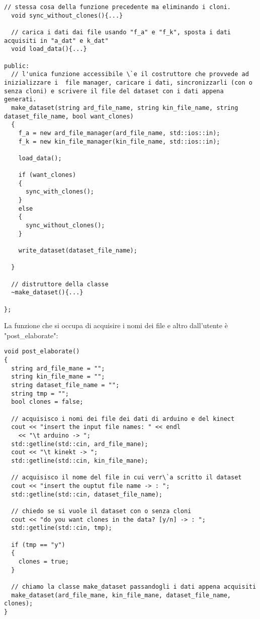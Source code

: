 \documentclass[10pt,a4paper]{article}
\begin{document}
\begin{lstlisting}[style=mycpp, caption=librerie usate, captionpos=b]
  // stessa cosa della funzione precedente ma eliminando i cloni.
  void sync_without_clones(){...}

  // carica i dati dai file usando "f_a" e "f_k", sposta i dati acquisiti in "a_dat" e k_dat"
  void load_data(){...}

public:
  // l'unica funzione accessibile \`e il costruttore che provvede ad inizializzare i  file manager, caricare i dati, sincronizzarli (con o senza cloni) e scrivere il file del dataset con i dati appena generati.
  make_dataset(string ard_file_name, string kin_file_name, string dataset_file_name, bool want_clones)
  {
    f_a = new ard_file_manager(ard_file_name, std::ios::in);
    f_k = new kin_file_manager(kin_file_name, std::ios::in);

    load_data();
    
    if (want_clones)
    {
      sync_with_clones();
    }
    else
    {
      sync_without_clones();
    }

    write_dataset(dataset_file_name);

  }

  // distruttore della classe
  ~make_dataset(){...}

};
\end{lstlisting}
La funzione che si occupa di acquisire i nomi dei file e altro dall'utente \`e "post\_elaborate":
\begin{lstlisting}[style=mycpp, caption=librerie usate, captionpos=b]
void post_elaborate()
{
  string ard_file_mane = "";
  string kin_file_mane = "";
  string dataset_file_name = "";
  string tmp = "";
  bool clones = false;
  
  // acquisisco i nomi dei file dei dati di arduino e del kinect
  cout << "insert the input file names: " << endl
    << "\t arduino -> ";
  std::getline(std::cin, ard_file_mane);
  cout << "\t kinekt -> ";
  std::getline(std::cin, kin_file_mane);

  // acquisisco il nome del file in cui verr\`a scritto il dataset
  cout << "insert the ouptut file name -> : ";
  std::getline(std::cin, dataset_file_name);

  // chiedo se si vuole il dataset con o senza cloni
  cout << "do you want clones in the data? [y/n] -> : ";
  std::getline(std::cin, tmp);

  if (tmp == "y")
  {
    clones = true;
  }
  
  // chiamo la classe make_dataset passandogli i dati appena acquisiti
  make_dataset(ard_file_mane, kin_file_mane, dataset_file_name, clones);
}
\end{lstlisting}
\end{document}
